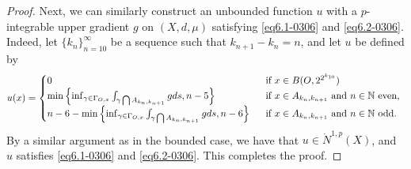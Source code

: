 \documentclass[10pt]{amsart}
\numberwithin{equation}{section}
\begin{document}
\begin{proof}
	Next,  we can similarly construct an unbounded function $u$ with a $p$-integrable upper gradient $g$ on $(X,d,\mu)$ satisfying \eqref{eq6.1-0306} and \eqref{eq6.2-0306}. Indeed, 
	let $\{k_n\}_{n=10}^\infty$ be a sequence such that $k_{n+1}-k_{n}=n$, and let $u$ be defined by
	\[ u(x)= \begin{cases}
    0&\text{\rm \ \ if $x\in B(O,2^{2^{k_{10}}})$}\\
 \min\left\{ \inf_{\gamma\in \Gamma_{O,x}}\int_{\gamma \bigcap A_{k_{n},k_{n+1}}}gds, n-5\right\}& \text{\rm \ \ if $x\in A_{k_n,k_{n+1}}$ and $n\in\mathbb N$ even, }\\
		n-6-  \min\left\{ \inf_{\gamma\in \Gamma_{O,x}}\int_{\gamma \bigcap A_{k_{n},k_{n+1}}}gds, n-6\right\} & \text{\rm \ \ if $x\in A_{k_n,k_{n+1}}$ and $n\in\mathbb N$ odd}.
		\end{cases}
	\]
	By a similar argument as in the bounded case, we have that $u\in \dot N^{1,p}(X)$, and $u$ satisfies \eqref{eq6.1-0306} and \eqref{eq6.2-0306}. This completes the proof.\qedhere
	
\end{proof}
\end{document}
